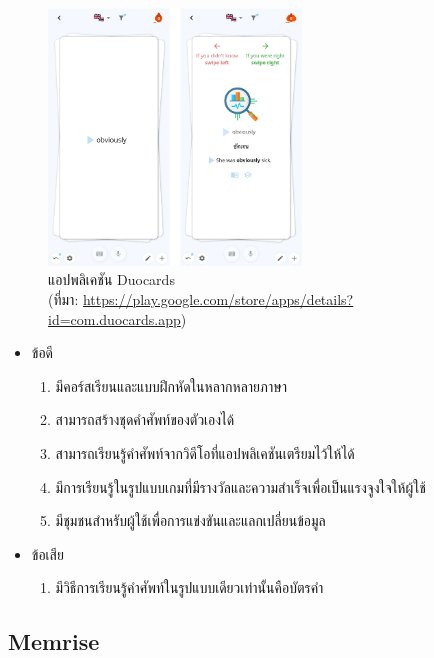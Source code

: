 \documentclass[12pt,oneside,openright,a4paper]{cpe-thai-project}
\begin{document}
\begin{figure}[!h]\centering
	\includegraphics[width=0.6\textwidth, keepaspectratio=true]{image/chap2/duocardsEX.png}
	\caption[แอปพลิเคชัน Duocards]{แอปพลิเคชัน Duocards\\ (ที่มา: \href {https://play.google.com/store/apps/details?id=com.duocards.app} {https://play.google.com/store/apps/details?id=com.duocards.app})\centering}\label{fig:duocardsEx}
\end{figure}

\begin{itemize}
	\item ข้อดี
	      \begin{enumerate}
		      \item มีคอร์สเรียนและแบบฝึกหัดในหลากหลายภาษา
		      \item สามารถสร้างชุดคำศัพท์ของตัวเองได้
		      \item สามารถเรียนรู้คำศัพท์จากวิดีโอที่แอปพลิเคชันเตรียมไว้ให้ได้
		      \item มีการเรียนรู้ในรูปแบบเกมที่มีรางวัลและความสำเร็จเพื่อเป็นแรงจูงใจให้ผู้ใช้
		      \item มีชุมชนสำหรับผู้ใช้เพื่อการแข่งขันและแลกเปลี่ยนข้อมูล
	      \end{enumerate}
	\item ข้อเสีย
	      \begin{enumerate}
		      \item มีวิธีการเรียนรู้คำศัพท์ในรูปแบบเดียวเท่านั้นคือบัตรคำ
	      \end{enumerate}
\end{itemize}

\pagebreak
\subsection{Memrise}
\end{document}
